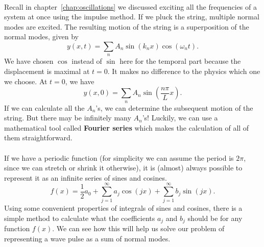 \documentclass[../classical_mechanics.tex]{subfiles}
\begin{document}
        \paragraph{}
        Recall in chapter~\ref{chap:oscillations} we discussed exciting all the frequencies of a system at once using the impulse method.
        If we pluck the string, multiple normal modes are excited.
        The resulting motion of the string is a superposition of the normal modes, given by
        \begin{equation}
            y(x,t)=\sum_n A_n\sin(k_n x)\cos(\omega_n t).
        \end{equation}
        We have chosen $\cos$ instead of $\sin$ here for the temporal part because the displacement is maximal at $t=0$.
        It makes no difference to the physics which one we choose.
        At $t=0$, we have
        \begin{equation}\label{eq:waves:plucked-string-initial-conditions}
            y(x,0)=\sum_n A_n\sin\left(\frac{n\pi}{L}x\right).
        \end{equation}
        If we can calculate all the $A_n$'s, we can determine the subsequent motion of the string.
        But there may be infinitely many $A_n$'s!
        Luckily, we can use a mathematical tool called \textbf{Fourier series} which makes the calculation of all of them straightforward.

        \paragraph{}
        If we have a periodic function (for simplicity we can assume the period is $2\pi$, since we can stretch or shrink it otherwise), it is (almost) always possible to represent it as an infinite series of sines and cosines.
        \begin{equation}\label{eq:waves:fourier-series}
            f(x)=\frac{1}{2}a_0+\sum_{j=1}^\infty a_j\cos(jx)+\sum_{j=1}^\infty b_j\sin(jx).
        \end{equation}
        Using some convenient properties of integrals of sines and cosines, there is a simple method to calculate what the coefficients $a_j$ and $b_j$ should be for any function $f(x)$.
        We can see how this will help us solve our problem of representing a wave pulse as a sum of normal modes.
\end{document}

